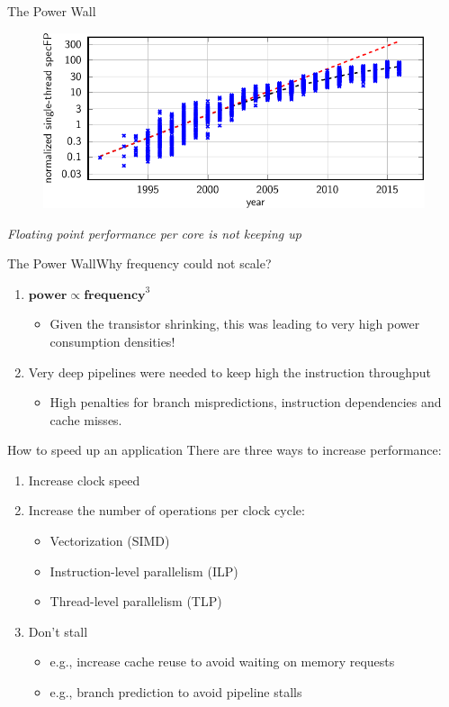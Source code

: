 \documentclass[aspectratio=169,12pt]{beamer}
\begin{document}
\begin{frame}{The Power Wall}
  \begin{figure}
    \centering
    \includegraphics[width=.8\textwidth]{fp_perf}
  \end{figure}
   \vspace{-.5\baselineskip}\centering
   \emph{Floating point performance per core is not keeping up}
\end{frame}

\begin{frame}{The Power Wall}{Why frequency could not scale?}
  \begin{enumerate}
  \item $\mathbf{power} \propto \mathbf{frequency}^3$
    \begin{itemize}
    \item Given the transistor shrinking, this was leading to very high power consumption densities!
    \end{itemize}
    \vspace\baselineskip
  \item Very deep pipelines were needed to keep high the instruction throughput
    \begin{itemize}
    \item High penalties for branch mispredictions, instruction dependencies and cache misses.
    \end{itemize}
  \end{enumerate}
\end{frame}

\begin{frame}{How to speed up an application}
  There are three ways to increase performance:
  \vfill
  \begin{enumerate}
  \item Increase clock speed
  \item Increase the number of operations per clock cycle:
    \begin{itemize}
    \item Vectorization (SIMD)
    \item Instruction-level parallelism (ILP)
    \item Thread-level parallelism (TLP)
    \end{itemize}
  \item Don't stall
    \begin{itemize}
    \item e.g., increase cache reuse to avoid waiting on memory requests
    \item e.g., branch prediction to avoid pipeline stalls
    \end{itemize}
  \end{enumerate}
\end{frame}
\end{document}
